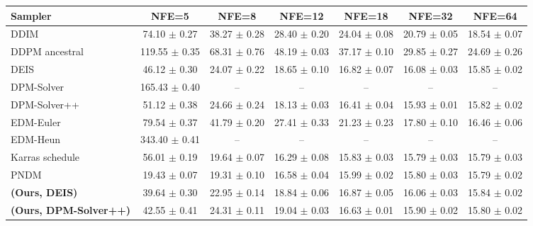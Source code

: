 \begin{tabular}{lcccccc}
\toprule
Sampler & NFE=5 & NFE=8 & NFE=12 & NFE=18 & NFE=32 & NFE=64 \\
\midrule
DDIM & 74.10 {\scriptsize $\pm$ 0.27} & 38.27 {\scriptsize $\pm$ 0.28} & 28.40 {\scriptsize $\pm$ 0.20} & 24.04 {\scriptsize $\pm$ 0.08} & 20.79 {\scriptsize $\pm$ 0.05} & 18.54 {\scriptsize $\pm$ 0.07} \\
DDPM ancestral & 119.55 {\scriptsize $\pm$ 0.35} & 68.31 {\scriptsize $\pm$ 0.76} & 48.19 {\scriptsize $\pm$ 0.03} & 37.17 {\scriptsize $\pm$ 0.10} & 29.85 {\scriptsize $\pm$ 0.27} & 24.69 {\scriptsize $\pm$ 0.26} \\
DEIS & 46.12 {\scriptsize $\pm$ 0.30} & 24.07 {\scriptsize $\pm$ 0.22} & 18.65 {\scriptsize $\pm$ 0.10} & 16.82 {\scriptsize $\pm$ 0.07} & 16.08 {\scriptsize $\pm$ 0.03} & 15.85 {\scriptsize $\pm$ 0.02} \\
DPM-Solver & 165.43 {\scriptsize $\pm$ 0.40} & -- & -- & -- & -- & -- \\
DPM-Solver++ & 51.12 {\scriptsize $\pm$ 0.38} & 24.66 {\scriptsize $\pm$ 0.24} & 18.13 {\scriptsize $\pm$ 0.03} & 16.41 {\scriptsize $\pm$ 0.04} & 15.93 {\scriptsize $\pm$ 0.01} & 15.82 {\scriptsize $\pm$ 0.02} \\
EDM-Euler & 79.54 {\scriptsize $\pm$ 0.37} & 41.79 {\scriptsize $\pm$ 0.20} & 27.41 {\scriptsize $\pm$ 0.33} & 21.23 {\scriptsize $\pm$ 0.23} & 17.80 {\scriptsize $\pm$ 0.10} & 16.46 {\scriptsize $\pm$ 0.06} \\
EDM-Heun & 343.40 {\scriptsize $\pm$ 0.41} & -- & -- & -- & -- & -- \\
Karras schedule & 56.01 {\scriptsize $\pm$ 0.19} & 19.64 {\scriptsize $\pm$ 0.07} & 16.29 {\scriptsize $\pm$ 0.08} & 15.83 {\scriptsize $\pm$ 0.03} & 15.79 {\scriptsize $\pm$ 0.03} & 15.79 {\scriptsize $\pm$ 0.03} \\
PNDM & 19.43 {\scriptsize $\pm$ 0.07} & 19.31 {\scriptsize $\pm$ 0.10} & 16.58 {\scriptsize $\pm$ 0.04} & 15.99 {\scriptsize $\pm$ 0.02} & 15.80 {\scriptsize $\pm$ 0.03} & 15.79 {\scriptsize $\pm$ 0.02} \\
\textbf{(Ours, DEIS)} & 39.64 {\scriptsize $\pm$ 0.30} & 22.95 {\scriptsize $\pm$ 0.14} & 18.84 {\scriptsize $\pm$ 0.06} & 16.87 {\scriptsize $\pm$ 0.05} & 16.06 {\scriptsize $\pm$ 0.03} & 15.84 {\scriptsize $\pm$ 0.02} \\
\textbf{(Ours, DPM-Solver++)} & 42.55 {\scriptsize $\pm$ 0.41} & 24.31 {\scriptsize $\pm$ 0.11} & 19.04 {\scriptsize $\pm$ 0.03} & 16.63 {\scriptsize $\pm$ 0.01} & 15.90 {\scriptsize $\pm$ 0.02} & 15.80 {\scriptsize $\pm$ 0.02} \\

\end{tabular}
